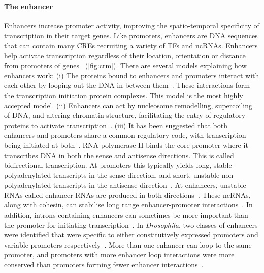 \documentclass[../main.tex]{subfiles}
\begin{document}
\paragraph{The enhancer}\label{chapter1:the-enhancer}
Enhancers increase promoter activity, improving the spatio\hyp{}temporal specificity of transcription in their target genes. Like promoters, enhancers are DNA sequences that can contain many CREs recruiting a variety of TFs and ncRNAs. Enhancers help activate transcription regardless of their location, orientation or distance from promoters of genes~\autocite{banerjiExpressionBetaglobinGene1981} (\autoref{fig:crm}).
There are several models explaining how enhancers work: (i) The proteins bound to enhancers and promoters interact with each other by looping out the DNA in between them~\autocite{carterLongrangeChromatinRegulatory2002,tolhuisLoopingInteractionHypersensitive2002,vilarDNALoopingGene2005,delaatChapterThreeDimensional2008,amanoChromosomalDynamicsShh2009}.
These interactions form the transcription initiation protein complexes. This model is the most highly accepted model.
(ii) Enhancers can act by nucleosome remodelling, supercoiling of DNA, and altering chromatin structure, facilitating the entry of regulatory proteins to activate transcription~\autocite{corlessEffectsDNASupercoiling2016}.
(iii) It has been suggested that both enhancers and promoters share a common regulatory code, with transcription being initiated at both~\autocite{coreNascentRNASequencing2008,engreitzLocalRegulationGene2016}.
RNA polymerase II binds the core promoter where it transcribes DNA in both the sense and antisense directions.
This is called bidirectional transcription.
At promoters this typically yields long, stable polyadenylated transcripts in the
sense direction, and short, unstable non\hyp{}polyadenylated transcripts in
the antisense direction~\autocite{anderssonPromoterEnhancerWhat2015}.
At enhancers, unstable RNAs called enhancer RNAs are produced in both directions~\autocite{dingEnhancerRNAsERNAs2018}.
These ncRNAs, along with cohesin, can stabilise long range enhancer\hyp{}promoter interactions~\autocite{oromLongNoncodingRNAs2010}.
In addition, introns containing enhancers can sometimes be more important than the promoter for initiating transcription~\autocite{gallegosIntronDNASequences2017}. In \textit{Drosophila}, two classes of enhancers were identified that were specific to either constitutively expressed promoters and variable promoters respectively~\autocite{zabidiEnhancerCorepromoterSpecificity2015}.
More than one enhancer can loop to the same promoter, and promoters with more enhancer loop interactions were more conserved than promoters forming fewer enhancer interactions~\autocite{dankoDynamicEvolutionRegulatory2018a}.
\end{document}
